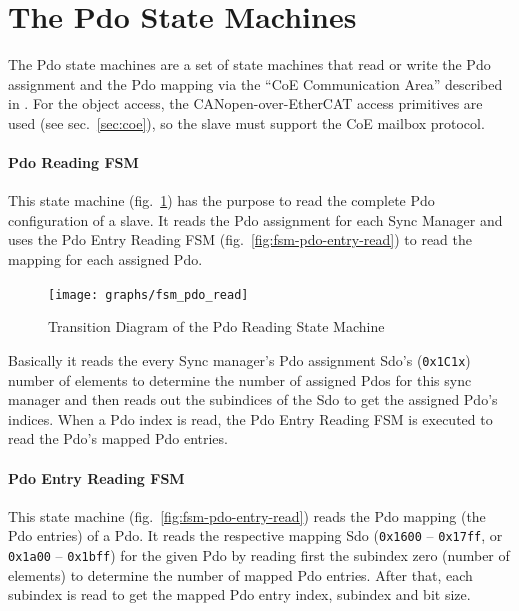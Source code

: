 \documentclass[a4paper,12pt,BCOR6mm,bibtotoc,idxtotoc]{scrbook}
\begin{document}

\section{The Pdo State Machines}
\label{sec:fsm-pdo}

The Pdo state machines are a set of state machines that read or write the Pdo
assignment and the Pdo mapping via the ``CoE Communication Area'' described in
\cite[sec. 5.6.7.4]{alspec}. For the object access, the CANopen-over-EtherCAT
access primitives are used (see sec.~\ref{sec:coe}), so the slave must support
the CoE mailbox protocol.

\paragraph{Pdo Reading FSM} This state machine (fig.~\ref{fig:fsm-pdo-read})
has the purpose to read the complete Pdo configuration of a slave. It reads
the Pdo assignment for each Sync Manager and uses the Pdo Entry Reading FSM
(fig.~\ref{fig:fsm-pdo-entry-read}) to read the mapping for each assigned Pdo.

\begin{figure}[htbp]
  \centering
  \texttt{[image: graphs/fsm\_pdo\_read]}
  \caption{Transition Diagram of the Pdo Reading State Machine}
  \label{fig:fsm-pdo-read}
\end{figure}

Basically it reads the every Sync manager's Pdo assignment Sdo's
(\lstinline+0x1C1x+) number of elements to determine the number of assigned
Pdos for this sync manager and then reads out the subindices of the Sdo to get
the assigned Pdo's indices. When a Pdo index is read, the Pdo Entry Reading
FSM is executed to read the Pdo's mapped Pdo entries.

\paragraph{Pdo Entry Reading FSM} This state machine
(fig.~\ref{fig:fsm-pdo-entry-read}) reads the Pdo mapping (the Pdo entries) of
a Pdo. It reads the respective mapping Sdo (\lstinline+0x1600+ --
\lstinline+0x17ff+, or \lstinline+0x1a00+ -- \lstinline+0x1bff+) for the given
Pdo by reading first the subindex zero (number of elements) to determine the
number of mapped Pdo entries. After that, each subindex is read to get the
mapped Pdo entry index, subindex and bit size.
\end{document}
